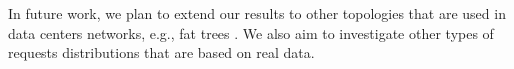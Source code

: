 \documentclass[conference]{IEEEtran}
\begin{document}
In future work, we plan to extend our results to other topologies that are used in data centers networks, e.g., fat trees \cite{fat:trees:Leiserson:1985}. We also aim to investigate other types of requests distributions that are based on real data. 


\end{document}
